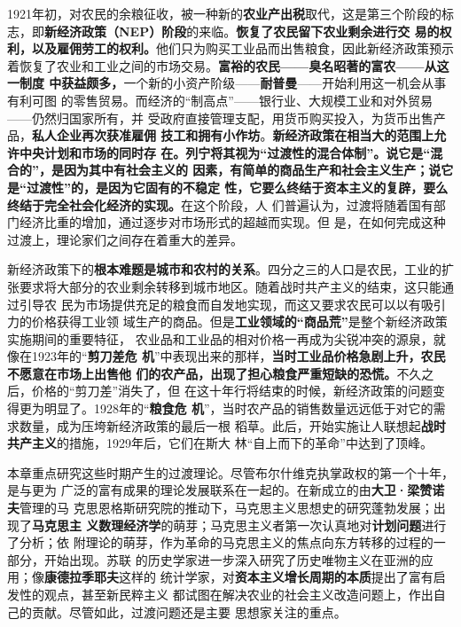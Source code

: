 1921年初，对农民的余粮征收，被一种新的\textbf{农业产出税}取代，这是第三个阶段的标
志，即\textbf{新经济政策（NEP）阶段}的来临。\textbf{恢复了农民留下农业剩余进行交
  易的权利，以及雇佣劳工的权利。}他们只为购买工业品而出售粮食，因此新经济政策预示
着恢复了农业和工业之间的市场交易。\textbf{富裕的农民——臭名昭著的富农——从这一制度
  中获益颇多，}一个新的小资产阶级——\textbf{耐普曼}——开始利用这一机会从事有利可图
的零售贸易。而经济的“制高点”——银行业、大规模工业和对外贸易——仍然归国家所有，并
受政府直接管理支配，用货币购买投入，为货币出售产品，\textbf{私人企业再次获准雇佣
  技工和拥有小作坊}。\textbf{新经济政策在相当大的范围上允许中央计划和市场的同时存
  在。列宁将其视为“过渡性的混合体制”。说它是“混合的”，是因为其中有社会主义的
  因素，有简单的商品生产和社会主义生产；说它是“过渡性”的，是因为它固有的不稳定
  性，它要么终结于资本主义的复辟，要么终结于完全社会化经济的实现。}在这个阶段，人
们普遍认为，过渡将随着国有部门经济比重的增加，通过逐步对市场形式的超越而实现。但
是，在如何完成这种过渡上，理论家们之间存在着重大的差异。

新经济政策下的\textbf{根本难题是城市和农村的关系}。四分之三的人口是农民，工业的扩
张要求将大部分的农业剩余转移到城市地区。随着战时共产主义的结束，这只能通过引导农
民为市场提供充足的粮食而自发地实现，而这又要求农民可以以有吸引力的价格获得工业领
域生产的商品。但是\textbf{工业领域的“商品荒”}是整个新经济政策实施期间的重要特征，
农业品和工业品的相对价格一再成为尖锐冲突的源泉，就像在1923年的“\textbf{剪刀差危
  机}”中表现出来的那样，\textbf{当时工业品价格急剧上升，农民不愿意在市场上出售他
  们的农产品，出现了担心粮食严重短缺的恐慌。}不久之后，价格的“剪刀差”消失了，但
在这十年行将结束的时候，新经济政策的问题变得更为明显了。1928年的“\textbf{粮食危
  机}”，当时农产品的销售数量远远低于对它的需求数量，成为压垮新经济政策的最后一根
稻草。此后，开始实施让人联想起\textbf{战时共产主义}的措施，1929年后，它们在斯大
林“自上而下的革命”中达到了顶峰。

本章重点研究这些时期产生的过渡理论。尽管布尔什维克执掌政权的第一个十年，是与更为
广泛的富有成果的理论发展联系在一起的。在新成立的由\textbf{大卫·梁赞诺夫}管理的马
克思恩格斯研究院的推动下，马克思主义思想史的研究蓬勃发展；出现了\textbf{马克思主
  义数理经济学}的萌芽；马克思主义者第一次认真地对\textbf{计划问题}进行了分析；依
附理论的萌芽，作为革命的马克思主义的焦点向东方转移的过程的一部分，开始出现。苏联
的历史学家进一步深入研究了历史唯物主义在亚洲的应用；像\textbf{康德拉季耶夫}这样的
统计学家，对\textbf{资本主义增长周期的本质}提出了富有启发性的观点，甚至新民粹主义
都试图在解决农业的社会主义改造问题上，作出自己的贡献。尽管如此，过渡问题还是主要
思想家关注的重点。

